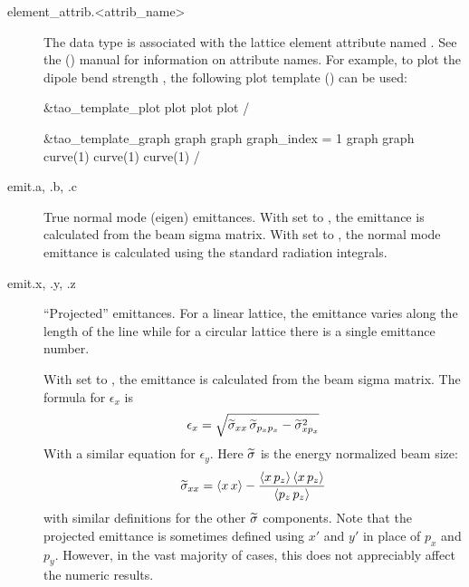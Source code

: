 \begin{description}
  \item[element_attrib.<attrib_name>] \Newline
The  data type is associated with the
lattice element attribute named . See the \bmad
(\cite{b:bmad}) manual for information on attribute names. For
example, to plot the dipole bend strength , the following
plot template () can be used:
\begin{example}
  &tao_template_plot
    plot%
    plot%
    plot%
  /

  &tao_template_graph
    graph%
    graph%
    graph_index = 1
    graph%
    graph%
    curve(1)%
    curve(1)%
    curve(1)%
  /
\end{example}

  \item[emit.a, .b, .c] \Newline
True normal mode (eigen) emittances.  With  set to , the
emittance is calculated from the beam sigma matrix. With  set to
, the normal mode emittance is calculated using the standard radiation
integrals.

  \item[emit.x, .y, .z] \Newline
``Projected'' emittances\cite{b:emit}. 
For a linear lattice, the emittance varies along the length
of the line while for a circular lattice there is a single emittance
number. 

With  set to , the emittance is calculated from the beam sigma
matrix. The formula for $\epsilon_x$ is
\begin{equation}
  \epsilon_x = \sqrt{ \widetilde\sigma_{xx} \, \widetilde\sigma_{p_xp_x} - \widetilde\sigma_{xp_x}^2}
\end{equation}
With a similar equation for $\epsilon_y$. Here $\widetilde\sigma$ is the energy normalized
beam size:
\begin{equation}
  \widetilde\sigma_{xx} = \langle x \, x \rangle - 
  \frac{\langle x \, p_z \rangle \, \langle x \, p_z \rangle}{\langle p_z \, p_z \rangle}
\end{equation}
with similar definitions for the other $\widetilde\sigma$ components. 
Note that the projected emittance is sometimes defined using
$x'$ and $y'$ in place of $p_x$ and $p_y$. However, in the vast
majority of cases, this does not appreciably affect the numeric
results.


\end{description}

